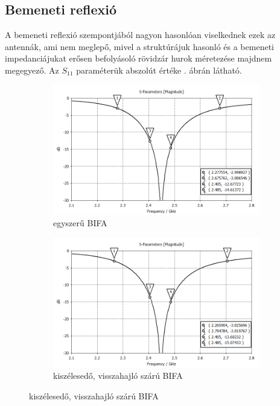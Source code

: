 \subsection{Bemeneti reflexió}
A bemeneti reflexió szempontjából nagyon hasonlóan viselkednek ezek az antennák, ami nem meglepő, mivel a struktúrájuk hasonló és a bemeneti impedanciájukat erősen befolyásoló rövidzár hurok méretezése majdnem megegyező. Az $S_{11}$ paraméterük abszolút értéke . ábrán látható.
\begin{figure}[h]
	\centering
	\begin{subfigure}[b]{0.7\textwidth}
		\centering
		\includegraphics[width=\textwidth]{kep/results/bifa_S11_dB.png}
		\caption{egyszerű BIFA}
	\end{subfigure}
	\hfill
	\begin{subfigure}[b]{0.7\textwidth}
		\centering
		\includegraphics[width=\textwidth]{kep/results/bifa_broadband_S11_dB.png}
		\caption{kiszélesedő, visszahajló szárú BIFA}
	\end{subfigure}

\end{figure}
